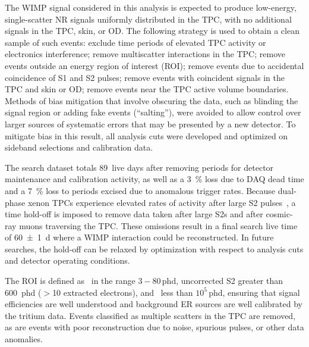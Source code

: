 

The WIMP signal considered in this analysis is expected to produce low-energy, single-scatter NR signals uniformly distributed in the TPC, with no additional signals in the TPC, skin, or OD. 
The following strategy is used to obtain a clean sample of such events: exclude time periods of elevated TPC activity or electronics interference; remove multiscatter interactions in the TPC; remove events outside an energy region of interest (ROI); remove events due to accidental coincidence of S1 and S2 pulses; remove events with coincident signals in the TPC and skin or OD; remove events near the TPC active volume boundaries.
Methods of bias mitigation that involve obscuring the data, such as blinding the signal region or adding fake events (``salting''), were avoided to allow control over larger sources of systematic errors that may be presented by a new detector. To mitigate bias in this result, all analysis cuts were developed and optimized on sideband selections and calibration data. 




The search dataset totals 89~live days after removing periods for detector maintenance and calibration activity, as well as a \SI{3}{\percent} loss due to DAQ dead time and a \SI{7}{\percent} loss to periods excised due to anomalous trigger rates. Because dual-phase xenon TPCs experience elevated rates of activity after large S2 pulses~\cite{akerib2017results, collaboration2018dark,sorensen2017electron, LUXelectronbkgs}, a time hold-off is imposed to remove data taken after large S2s and after cosmic-ray muons traversing the TPC. These omissions result in a final search live time of \SI{60(1)}{d} where a WIMP interaction could be reconstructed. 
In future searches, the hold-off can be relaxed by optimization with respect to analysis cuts and detector operating conditions.

The ROI is defined as \sonec~in the range $3-80$\,phd, uncorrected S2 greater than \SI{600}{phd} ($>$10 extracted electrons), and \stwoc~less than $10^5$\,phd, ensuring that signal efficiencies are well understood and background ER sources are well calibrated by the tritium data.
Events classified as multiple scatters in the TPC are removed, as are events with poor reconstruction due to noise, spurious pulses, or other data anomalies.

